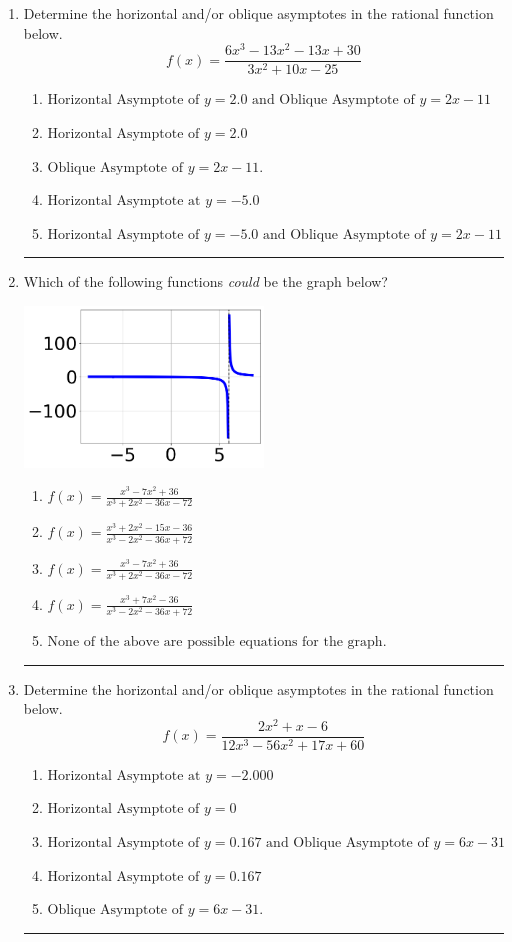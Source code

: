 \documentclass[14pt]{extbook}
\newcommand{\litem}[1]{\item#1\hspace*{-1cm}\rule{\textwidth}{0.4pt}}
\begin{document}
\begin{enumerate}
\litem{
Determine the horizontal and/or oblique asymptotes in the rational function below.\[ f(x) = \frac{6x^{3} -13 x^{2} -13 x + 30}{3x^{2} +10 x -25} \]\begin{enumerate}[label=\Alph*.]
\item \( \text{Horizontal Asymptote of } y = 2.0 \text{ and Oblique Asymptote of } y = 2x -11 \)
\item \( \text{Horizontal Asymptote of } y = 2.0  \)
\item \( \text{Oblique Asymptote of } y = 2x -11. \)
\item \( \text{Horizontal Asymptote at } y = -5.0 \)
\item \( \text{Horizontal Asymptote of } y = -5.0 \text{ and Oblique Asymptote of } y = 2x -11 \)

\end{enumerate} }
\litem{
Which of the following functions \textit{could} be the graph below?
\begin{center}
    \includegraphics[width=0.5\textwidth]{../Figures/identifyGraphOfRationalFunctionC.png}
\end{center}
\begin{enumerate}[label=\Alph*.]
\item \( f(x)=\frac{x^{3} -7 x^{2} + 36}{x^{3} +2 x^{2} -36 x -72} \)
\item \( f(x)=\frac{x^{3} +2 x^{2} -15 x -36}{x^{3} -2 x^{2} -36 x + 72} \)
\item \( f(x)=\frac{x^{3} -7 x^{2} + 36}{x^{3} +2 x^{2} -36 x -72} \)
\item \( f(x)=\frac{x^{3} +7 x^{2} -36}{x^{3} -2 x^{2} -36 x + 72} \)
\item \( \text{None of the above are possible equations for the graph.} \)

\end{enumerate} }
\litem{
Determine the horizontal and/or oblique asymptotes in the rational function below.\[ f(x) = \frac{2x^{2} +x -6}{12x^{3} -56 x^{2} +17 x + 60} \]\begin{enumerate}[label=\Alph*.]
\item \( \text{Horizontal Asymptote at } y = -2.000 \)
\item \( \text{Horizontal Asymptote of } y = 0 \)
\item \( \text{Horizontal Asymptote of } y = 0.167 \text{ and Oblique Asymptote of } y = 6x -31 \)
\item \( \text{Horizontal Asymptote of } y = 0.167  \)
\item \( \text{Oblique Asymptote of } y = 6x -31. \)


\end{enumerate}}
\end{enumerate}
\end{document}
